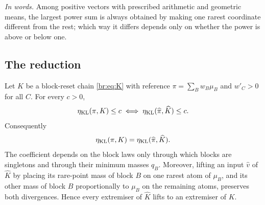 \noindent\textit{In words.} Among positive vectors with prescribed
arithmetic and geometric means, the largest power sum is always obtained by
making one rarest coordinate different from the rest; which way it differs
depends only on whether the power is above or below one.

\subsection{The reduction}

\begin{theorem}\label{br:thm:reduction}
Let \(K\) be a block-reset chain \eqref{br:eq:K} with reference
\(\pi=\sum_Bw_B\mu_B\) and \(w'_C>0\) for all \(C\). For every \(c>0\),
\[
\eta_{\mathrm{KL}}(\pi,K)\le c\iff\eta_{\mathrm{KL}}(\widehat\pi,\widehat K)\le c .
\]
Consequently
\begin{equation}\label{br:eq:main}
\eta_{\mathrm{KL}}(\pi,K)=\eta_{\mathrm{KL}}(\widehat\pi,\widehat K).
\end{equation}
The coefficient depends on the block laws only through which blocks are singletons
and through their minimum masses \(q_B\). Moreover, lifting an
input \(\widehat v\) of \(\widehat K\) by placing its rare-point mass of
block \(B\) on one rarest atom of \(\mu_B\), and its other mass of block \(B\)
proportionally to \(\mu_B\) on the remaining atoms, preserves both divergences.
Hence every extremiser of \(\widehat K\) lifts to an extremiser of \(K\).
\end{theorem}

